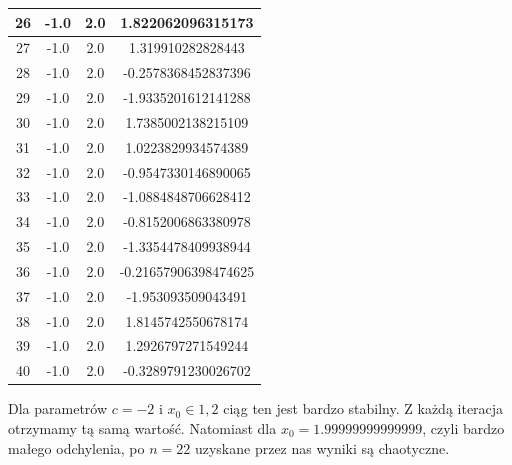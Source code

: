 \documentclass[10pt,a4paper, polish]{article}
\begin{document}
\begin{table}[H]
\begin{tabular}{|c|c|c|c|}
\hline
26 & -1.0 & 2.0 & 1.822062096315173 \\
\hline
27 & -1.0 & 2.0 & 1.319910282828443 \\
\hline
28 & -1.0 & 2.0 & -0.2578368452837396 \\
\hline
29 & -1.0 & 2.0 & -1.9335201612141288 \\
\hline
30 & -1.0 & 2.0 & 1.7385002138215109 \\
\hline
31 & -1.0 & 2.0 & 1.0223829934574389 \\
\hline
32 & -1.0 & 2.0 & -0.9547330146890065 \\
\hline
33 & -1.0 & 2.0 & -1.0884848706628412 \\
\hline
34 & -1.0 & 2.0 & -0.8152006863380978 \\
\hline
35 & -1.0 & 2.0 & -1.3354478409938944 \\
\hline
36 & -1.0 & 2.0 & -0.21657906398474625 \\
\hline
37 & -1.0 & 2.0 & -1.953093509043491 \\
\hline
38 & -1.0 & 2.0 & 1.8145742550678174 \\
\hline
39 & -1.0 & 2.0 & 1.2926797271549244 \\
\hline
40 & -1.0 & 2.0 & -0.3289791230026702 \\
\hline
\end{tabular}
\end{table}

Dla parametrów $c = -2$ i $x_0 \in {1,2}$ ciąg ten jest bardzo stabilny. Z każdą iteracja otrzymamy tą samą wartość. Natomiast dla $x_0 = 1.99999999999999$, czyli bardzo małego odchylenia, po $n = 22$ uzyskane przez nas wyniki są chaotyczne. 
\end{document}
